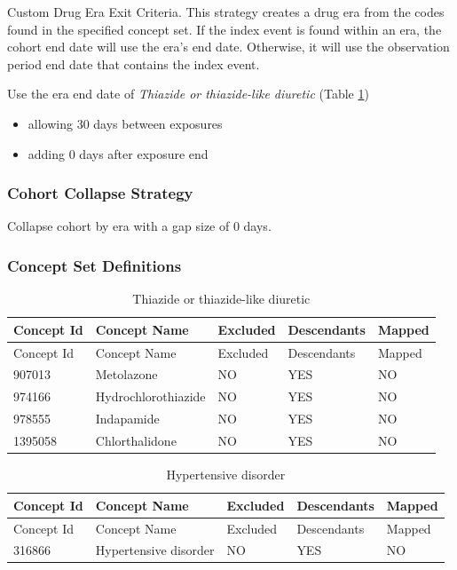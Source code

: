 \documentclass[11pt]{book}
\providecommand{\tightlist}{%
  \setlength{\itemsep}{0pt}\setlength{\parskip}{0pt}}
\theoremstyle{definition}
\theoremstyle{definition}
\theoremstyle{definition}
\theoremstyle{remark}
\begin{document}
Custom Drug Era Exit Criteria.
This strategy creates a drug era from the codes found in the specified concept set. If the index event is found within an era, the cohort end date will use the era's end date. Otherwise, it will use the observation period end date that contains the index event.

Use the era end date of \emph{Thiazide or thiazide-like diuretic} (Table \ref{tab:thiazidesMono})

\begin{itemize}
\tightlist
\item
  allowing 30 days between exposures
\item
  adding 0 days after exposure end
\end{itemize}

\hypertarget{cohort-collapse-strategy-4}{%
\subsubsection*{Cohort Collapse Strategy}\label{cohort-collapse-strategy-4}}

Collapse cohort by era with a gap size of 0 days.

\hypertarget{concept-set-definitions-4}{%
\subsubsection*{Concept Set Definitions}\label{concept-set-definitions-4}}

\begin{longtable}[]{@{}lllll@{}}
\caption{\label{tab:thiazidesMono} Thiazide or thiazide-like diuretic}\tabularnewline
\toprule
Concept Id & Concept Name & Excluded & Descendants & Mapped\tabularnewline
\midrule
\endfirsthead
\toprule
Concept Id & Concept Name & Excluded & Descendants & Mapped\tabularnewline
\midrule
\endhead
907013 & Metolazone & NO & YES & NO\tabularnewline
974166 & Hydrochlorothiazide & NO & YES & NO\tabularnewline
978555 & Indapamide & NO & YES & NO\tabularnewline
1395058 & Chlorthalidone & NO & YES & NO\tabularnewline
\bottomrule
\end{longtable}

\begin{longtable}[]{@{}lllll@{}}
\caption{\label{tab:hypertensionThzMono} Hypertensive disorder}\tabularnewline
\toprule
Concept Id & Concept Name & Excluded & Descendants & Mapped\tabularnewline
\midrule
\endfirsthead
\toprule
Concept Id & Concept Name & Excluded & Descendants & Mapped\tabularnewline
\midrule
\endhead
316866 & Hypertensive disorder & NO & YES & NO\tabularnewline
\bottomrule
\end{longtable}
\end{document}
